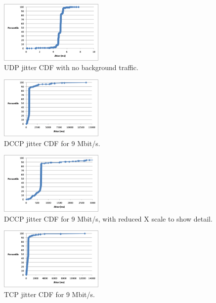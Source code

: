 \begin{figure}[!h]
   \centering
      \includegraphics[width=0.45\textwidth]{pics/udp_none_jitter}
   \caption{UDP jitter CDF with no background traffic.}
\label{fig:udp_none_jitter}
\end{figure}

\begin{figure}[!h]
   \centering
      \includegraphics[width=0.45\textwidth]{pics/dccp_9_jitter_new}
   \caption{DCCP jitter CDF for 9 Mbit/s.}
\label{fig:dccp_9_jitter}
\end{figure}

\begin{figure}[!h]
   \centering
      \includegraphics[width=0.45\textwidth]{pics/dccp_9_jitter_closeup}
   \caption{DCCP jitter CDF for 9 Mbit/s, with reduced X scale to show detail.}
\label{fig:dccp_9_jitter_closeup}
\end{figure}

\begin{figure}[!h]
   \centering
      \includegraphics[width=0.45\textwidth]{pics/tcp_9_jitter}
   \caption{TCP jitter CDF for 9 Mbit/s.}
\label{fig:tcp_9_jitter}
\end{figure}

